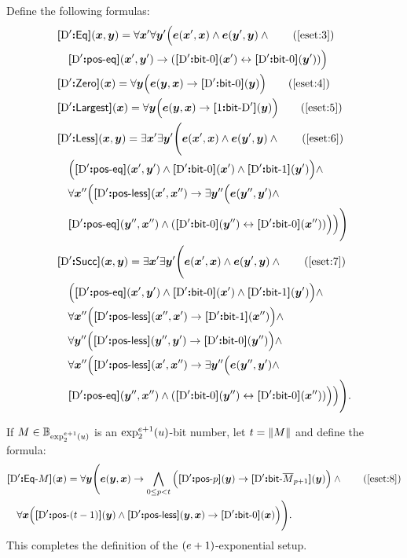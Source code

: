 Define the following formulas:
\begin{align}
  &\fEq\DSp(\xx,\yy) = \forall\xxp\forall\yyp\Big(\se(\xxp,\xx) \land
  \se(\yyp,\yy) \land \tag{\ref{eset:3}} \\
  &\quad\fposeq\DSp(\xxp,\yyp) \limp (\fbitO\DSp(\xxp) \lequ
  \fbitO\DSp(\yyp))\Big)
  \nonumber \\
  &\fZero\DSp(\xx) = \forall\yy\Big(\se(\yy,\xx) \limp \fbitO\DSp(\yy)\Big)
  \tag{\ref{eset:4}} \\
  &\fLargest\DSp(\xx) = \forall\yy\Big(\se(\yy,\xx) \limp \fbit1\DSp(\yy)\Big)
  \tag{\ref{eset:5}} \\
  &\fLess\DSp(\xx,\yy) = \exists\xxp\exists\yyp\Bigg(\se(\xxp,\xx) \land
  \se(\yyp,\yy) \land \tag{\ref{eset:6}} \\
  &\quad\Big(\fposeq\DSp(\xxp,\yyp) \land \fbitO\DSp(\xxp) \land
  \fbitI\DSp(\yyp)\Big) \land \nonumber \\
  &\quad\forall\xxpp\Big(\fposless\DSp(\xxp,\xxpp) \limp \exists\yypp\Big(
  \se(\yypp,\yyp) \land \nonumber \\
  &\quad\fposeq\DSp(\yypp,\xxpp) \land (\fbitO\DSp(\yypp) \lequ
  \fbitO\DSp(\xxpp)) \Big)\Big)\Bigg) \nonumber \\
  &\fSucc\DSp(\xx,\yy) = \exists\xxp\exists\yyp\Bigg(\se(\xxp,\xx) \land
  \se(\yyp,\yy) \land \tag{\ref{eset:7}} \\
  &\quad\Big(\fposeq\DSp(\xxp,\yyp) \land \fbitO\DSp(\xxp) \land
  \fbitI\DSp(\yyp)\Big) \land \nonumber \\
  &\quad\forall\xxpp\Big(\fposless\DSp(\xxpp,\xxp) \limp \fbitI\DSp(\xxpp)\Big)
  \land \nonumber \\
  &\quad\forall\yypp\Big(\fposless\DSp(\yypp,\yyp) \limp \fbitO\DSp(\yypp)\Big)
  \land \nonumber \\
  &\quad\forall\xxpp\Big(\fposless\DSp(\xxp,\xxpp) \limp \exists\yypp\Big(
  \se(\yypp,\yyp) \land \nonumber \\
  &\quad\fposeq\DSp(\yypp,\xxpp) \land (\fbitO\DSp(\yypp) \lequ
  \fbitO\DSp(\xxpp))\Big)\Big)\Bigg). \nonumber
\end{align}

If $\nM \in \tBitnums{\tetr{\sze+1}2\szu}$ is an $\tetr{\sze+1}2\szu$-bit
number, let $\tbit = \bsz\nM$ and define the formula:
\begin{align}
&\fDataA\DSp\nM(\xx) = \forall\yy\Bigg(\se(\yy,\xx) \limp
\bigwedge_{0 \leq \posp < \tbit} \Big(\fposA\DSp\posp(\yy) \limp
\fbit\DSp{\benc{\nM}_{\posp+1}}(\yy)\Big) \land \tag{\ref{eset:8}} \\
&\quad\forall\xx\Big(\fposA\DSp{(\tbit-1)}(\yy) \land 
\fposless\DSp(\yy,\xx) \limp \fbitO\DSp(\xx)\Big)\Bigg). \nonumber
\end{align}
This completes the definition of the $(\sze+1)$-exponential setup.

